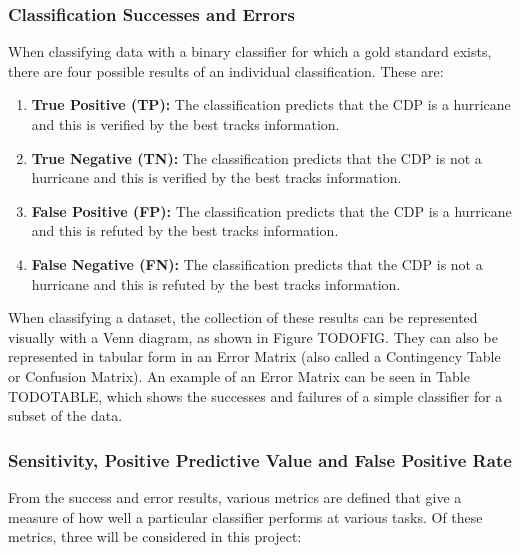 \documentclass[pdftex,12pt,a4paper]{report}
\begin{document}

\subsubsection{Classification Successes and Errors}


When classifying data with a binary classifier for which a gold standard exists, there are four
possible results of an individual classification. These are:

\begin{enumerate}
    \item \textbf{True Positive (TP):} The classification predicts that the CDP is a hurricane and
        this is verified by the best tracks information.
    \item \textbf{True Negative (TN):} The classification predicts that the CDP is not a hurricane
        and this is verified by the best tracks information.
    \item \textbf{False Positive (FP):} The classification predicts that the CDP is a hurricane and
        this is refuted by the best tracks information.
    \item \textbf{False Negative (FN):} The classification predicts that the CDP is not a hurricane
        and this is refuted by the best tracks information.
\end{enumerate}

When classifying a dataset, the collection of these results can be represented visually with a Venn
diagram, as shown in Figure TODOFIG. They can also be represented in tabular form in an Error Matrix
(also called a Contingency Table or Confusion Matrix). An example of an Error Matrix can be seen in
Table TODOTABLE, which shows the successes and failures of a simple classifier for a subset of the data.

\subsubsection{Sensitivity, Positive Predictive Value and False Positive Rate}

From the success and error results, various metrics are defined that give a measure of how well a
particular classifier performs at various tasks. Of these metrics, three will be considered in this
project:
\end{document}
